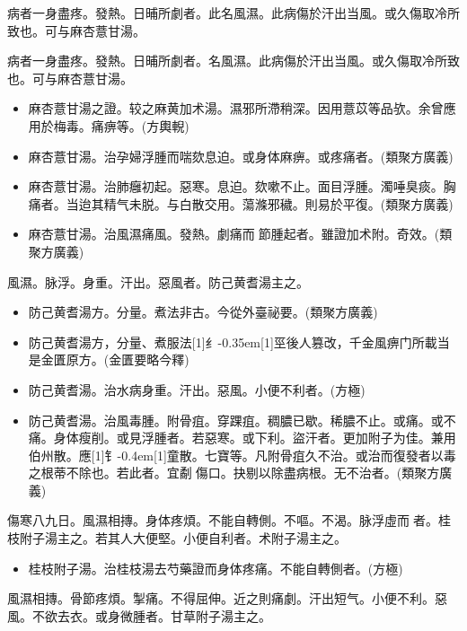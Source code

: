 \documentclass[oneside,b4paper]{ctexbook}
\begin{document}
\begin{flushleft}
病者一身盡疼。發熱。日晡所劇者。此名風濕。此病傷於汗出当風。或久傷取冷所致也。可与麻杏薏甘湯。

病者一身盡疼。發熱。日晡所劇者。名風濕。此病傷於汗出当風。或久傷取冷所致也。可与麻杏薏甘湯。

\begin{itemize}
\item 麻杏薏甘湯之證。较之麻黄加术湯。濕邪所滯稍深。因用薏苡等品欤。余曾應用於梅毒。痛痹等。(方輿輗)
\item 麻杏薏甘湯。治孕婦浮腫而喘欬息迫。或身体麻痹。或疼痛者。(類聚方廣義)
\item 麻杏薏甘湯。治肺癰初起。惡寒。息迫。欬嗽不止。面目浮腫。濁唾臭痰。胸痛者。当迨其精气未脱。与白散交用。蕩滌邪穢。則易於平復。(類聚方廣義)
\item 麻杏薏甘湯。治風濕痛風。發熱。劇痛而{𬮦}節腫起者。雖證加术附。奇效。(類聚方廣義)
\end{itemize}

風濕。脉浮。身重。汗出。惡風者。防己黄耆湯主之。

\begin{itemize}
\item 防己黄耆湯方。分量。煮法非古。今從外臺祕要。(類聚方廣義)
\item 防己黄耆湯方，分量、煮服法{\hbox{\scalebox{0.68}[1]{纟}\kern-0.35em\scalebox{0.64}[1]{巠}}}後人篡改，千金風痹门所載当是金匱原方。(金匱要略今釋)
\item 防己黄耆湯。治水病身重。汗出。惡風。小便不利者。(方極)
\item 防己黄耆湯。治風毒腫。附骨疽。穿踝疽。稠膿已歇。稀膿不止。或痛。或不痛。身体瘦削。或見浮腫者。若惡寒。或下利。盜汗者。更加附子为佳。兼用伯州散。應{\hbox{\scalebox{0.7}[1]{钅}\kern-0.4em\scalebox{0.7}[1]{童}}}散。七寶等。凡附骨疽久不治。或治而復發者以毒之根蒂不除也。若此者。宜劀{𫔭}傷口。抉剔以除盡病根。无不治者。(類聚方廣義)
\end{itemize}

傷寒八九日。風濕相摶。身体疼煩。不能自轉側。不嘔。不渴。脉浮虛而{𬈧}者。桂枝附子湯主之。若其人大便堅。小便自利者。术附子湯主之。

\begin{itemize}
\item 桂枝附子湯。治桂枝湯去芍藥證而身体疼痛。不能自轉側者。(方極)
\end{itemize}

風濕相摶。骨節疼煩。掣痛。不得屈伸。近之則痛劇。汗出短气。小便不利。惡風。不欲去衣。或身微腫者。甘草附子湯主之。


\end{flushleft}
\end{document}
